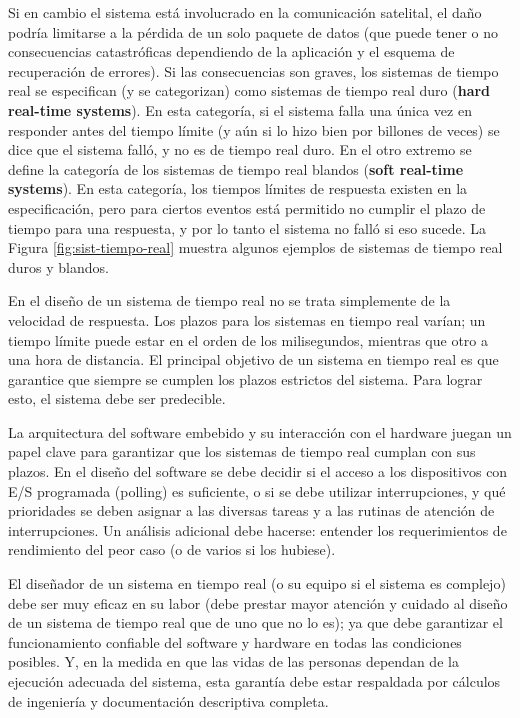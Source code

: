 \documentclass[output=paper, 
colorlinks,
citecolor=brown,
newtxmath
]{langscibook}
\begin{document}
Si en cambio el sistema está involucrado en la comunicación satelital, el daño podría 
limitarse a la pérdida de un solo paquete de datos (que puede tener o no consecuencias 
catastróficas dependiendo de la aplicación y el esquema de recuperación de errores). 
Si las consecuencias son graves, los sistemas de tiempo real se especifican (y se categorizan)
como sistemas de tiempo real duro (\textbf{hard real-time systems}). En esta categoría, si el sistema falla una única vez
en responder antes del tiempo límite (y aún si lo hizo bien por billones de veces) se dice que el 
sistema falló, y no es de tiempo real duro.
En el otro extremo se define la categoría de los sistemas de tiempo real blandos (\textbf{soft real-time systems}).
En esta categoría, los tiempos límites de respuesta existen en la especificación, pero para
ciertos eventos está permitido no cumplir el plazo de tiempo para una respuesta, y por lo tanto
el sistema no falló si eso sucede.
La Figura \ref{fig:sist-tiempo-real} muestra algunos ejemplos de sistemas de tiempo real duros y blandos.







En el diseño de un sistema de tiempo real no se trata simplemente de la
velocidad de respuesta. Los plazos para los sistemas en tiempo real varían; 
un tiempo límite puede estar en el orden de los milisegundos, mientras que otro 
a una hora de distancia. El principal objetivo de un sistema en tiempo real es
que garantice que siempre se cumplen los plazos estrictos del sistema. 
Para lograr esto, el sistema debe ser predecible.


La arquitectura del software embebido y su interacción con el hardware juegan 
un papel clave para garantizar que los sistemas de tiempo real cumplan con sus plazos. 
En el diseño del software se debe decidir si el acceso a los dispositivos con E/S programada
(polling) es suficiente, o si se debe utilizar interrupciones, y qué prioridades 
se deben asignar a las diversas tareas y a las rutinas de atención de interrupciones. 
Un análisis adicional debe hacerse: entender los requerimientos de rendimiento del peor caso
(o de varios si los hubiese).


El diseñador de un sistema en tiempo real (o su equipo si el sistema es complejo) debe ser
muy eficaz en su labor (debe prestar mayor atención y cuidado al diseño de un sistema
de tiempo real que de uno que no lo es); 
ya que debe 
garantizar el funcionamiento confiable del software y hardware en todas 
las condiciones posibles. Y, en la medida en que las vidas de las personas dependan 
de la ejecución adecuada del sistema, esta garantía debe estar respaldada por 
cálculos de ingeniería y documentación descriptiva completa.
\end{document}
